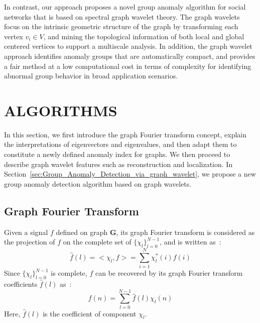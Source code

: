 \documentclass[twoside,leqno,twocolumn]{article}
\begin{document}
In contrast, our approach proposes a novel group anomaly algorithm for social networks that is based on spectral graph wavelet theory.
The graph wavelets focus on the intrinsic geometric structure of the graph by transforming each vertex $v_i\in V$, and mining the topological information of both local and global centered vertices to support a multiscale analysis. In addition, the graph wavelet approach identifies anomaly groups that are automatically compact, and provides a fair method at a low computational cost in terms of complexity for identifying abnormal group behavior in broad application scenarios.


\section{ALGORITHMS} \label{sec:algorithm}
In this section, we first introduce the graph Fourier transform concept, explain the interpretations of eigenvectors and eigenvalues, and then adapt them to constitute a newly defined anomaly index for graphs. We then proceed to describe graph wavelet features such as reconstruction and localization. In Section~\ref{sec:Group_Anomaly_Detection_via_graph_wavelet}, we propose a new group anomaly detection algorithm based on graph wavelets.

\subsection{Graph Fourier Transform}
\label{sec:Graph_Fourier_Transform}
Given a signal $f$ defined on graph $\mathbf{G}$, its graph Fourier transform is considered as the projection of $f$ on the complete set of $\{\chi_l\}_{l=0}^{N-1}$, and is written as~\cite{hammond2011wavelets}:
\begin{equation}
\label{eq:Graph_Fourier_Transform1}
\hat{f}(l)=<\chi_{l},f>=\sum_{i=1}^{N}\chi^*_{l}(i)f(i)
\end{equation}
Since $\{\chi_l\}_{l=0}^{N-1}$ is complete, $f$ can be recovered by its graph Fourier transform coefficients $\hat{f}(l)$ as~\cite{hammond2011wavelets}:
\begin{equation}
\label{eq:Inverser_Graph_Fourier_Transform}
f(n)=\sum_{l=0}^{N-1}\hat{f}(l)\chi_{l}(n)
\end{equation}
Here, $\hat{f}(l)$ is the coefficient of component $\chi_l$.
\end{document}
